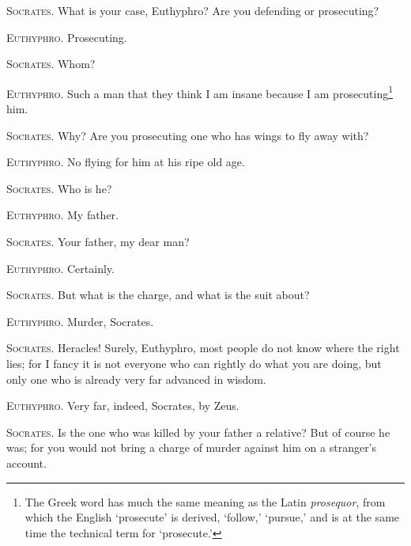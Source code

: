 \textsc{Socrates}. What is your case, Euthyphro? Are you defending or
prosecuting?

\textsc{Euthyphro}. Prosecuting.

\textsc{Socrates}. Whom?

\textsc{Euthyphro}. Such a man that they think I am insane because I
am prosecuting\footnote{The Greek word has much the same meaning as
the Latin \textit{prosequor}, from which the English `prosecute' is
derived, `follow,' `pursue,' and is at the same time the technical
term for `prosecute.'} him.

\textsc{Socrates}. Why? Are you prosecuting one who has wings to fly
away with?

\textsc{Euthyphro}. No flying for him at his ripe old age.

\textsc{Socrates}. Who is he?

\textsc{Euthyphro}. My father.

\textsc{Socrates}. Your father, my dear man?

\textsc{Euthyphro}. Certainly.

\textsc{Socrates}. But what is the charge, and what is the suit about?

\textsc{Euthyphro}. Murder, Socrates.

\textsc{Socrates}. Heracles! Surely, Euthyphro, most people do not
know where the right lies; for I fancy it is not everyone who can
rightly do what you are doing, but only one who is already very far
advanced in wisdom.

\textsc{Euthyphro}. Very far, indeed, Socrates, by Zeus.

\textsc{Socrates}. Is the one who was killed by your father a
relative? But of course he was; for you would not bring a charge of
murder against him on a stranger's account.

